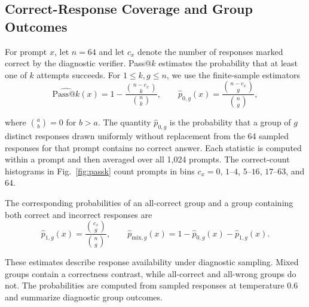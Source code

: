 \documentclass[]{jingdong}
\theoremstyle{plain}
\theoremstyle{definition}
\theoremstyle{remark}
\begin{document}
\subsection{Correct-Response Coverage and Group Outcomes}
\label{app:passk-definition}

For prompt $x$, let $n=64$ and let $c_x$ denote the number of responses marked correct by the diagnostic verifier. Pass@$k$ estimates the probability that at least one of $k$ attempts succeeds. For $1\leq k,g\leq n$, we use the finite-sample estimators
\begin{equation}
\label{eq:app-passk}
\widehat{\mathrm{Pass@}k}(x)
=1-\frac{\binom{n-c_x}{k}}{\binom{n}{k}},
\qquad
\widehat p_{0,g}(x)
=\frac{\binom{n-c_x}{g}}{\binom{n}{g}},
\end{equation}


where $\binom{a}{b}=0$ for $b>a$. The quantity $\widehat p_{0,g}$ is the probability that a group of $g$ distinct responses drawn uniformly without replacement from the 64 sampled responses for that prompt contains no correct answer. Each statistic is computed within a prompt and then averaged over all 1,024 prompts. The correct-count histograms in Fig.~\ref{fig:passk} count prompts in bins $c_x=0$, $1$--$4$, $5$--$16$, $17$--$63$, and $64$.

The corresponding probabilities of an all-correct group and a group containing both correct and incorrect responses are
\begin{equation}
\label{eq:app-mixed-groups}
\widehat p_{1,g}(x)=\frac{\binom{c_x}{g}}{\binom{n}{g}},
\qquad
\widehat p_{\mathrm{mix},g}(x)=1-\widehat p_{0,g}(x)-\widehat p_{1,g}(x).
\end{equation}


These estimates describe response availability under diagnostic sampling. Mixed groups contain a correctness contrast, while all-correct and all-wrong groups do not. The probabilities are computed from sampled responses at temperature 0.6 and summarize diagnostic group outcomes.
\end{document}

